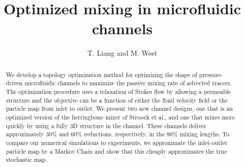 \documentclass[times]{fldauth}
\begin{document}

\title{Optimized mixing in microfluidic channels}

\author{T. Liang and M. West\corrauth}

\address{Aeronautics and Astronautics,
  Stanford University, Stanford, CA 94305, USA\break
  Mechanical Science and Engineering,
  University of Illinois at Urbana-Champaign, Urbana, IL 61801, USA}



\graphicspath{{figures/}}



\begin{abstract}
  We develop a topology optimization method for optimizing the shape
  of pressure-driven microfluidic channels to maximize the passive
  mixing rate of advected tracers. The optimization procedure uses a
  relaxation of Stokes flow by allowing a permeable structure and the
  objective can be a function of either the fluid velocity field or
  the particle map from inlet to outlet. We present two new channel
  designs, one that is an optimized version of the herringbone mixer
  of Stroock et al., and one that mixes more quickly by using a fully
  3D structure in the channel. These channels deliver approximately
  30\% and 60\% reductions, respectively, in the 90\% mixing
  lengths. To compare our numerical simulations to experiments, we
  approximate the inlet-outlet particle map by a Markov Chain and show
  that this cheaply approximates the true stochastic map.
\end{abstract}


\maketitle
\end{document}
